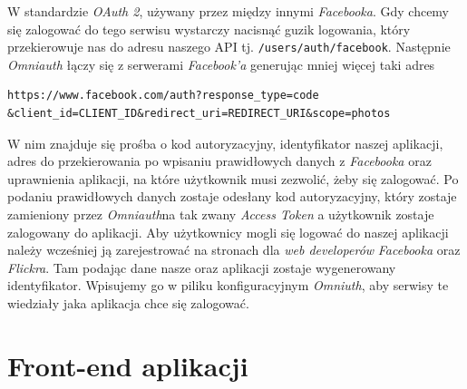 \documentclass[openright]{xmgr}
\begin{document}
\newpage\indent W standardzie \textit{OAuth 2}, używany przez między innymi \textit{Facebooka}. Gdy chcemy się zalogować do tego serwisu wystarczy nacisnąć guzik logowania, który przekierowuje nas do adresu naszego API tj. \verb|/users/auth/facebook|. Następnie \textit{Omniauth} łączy się z serwerami \textit{Facebook'a} generując mniej więcej taki adres 
\begin{verbatim}
https://www.facebook.com/auth?response_type=code
&client_id=CLIENT_ID&redirect_uri=REDIRECT_URI&scope=photos
\end{verbatim}
 W nim znajduje się prośba o kod autoryzacyjny, identyfikator naszej aplikacji, adres do przekierowania po wpisaniu prawidłowych danych z \textit{Facebooka} oraz uprawnienia aplikacji, na które użytkownik musi zezwolić, żeby się zalogować. Po podaniu prawidłowych danych zostaje odesłany kod autoryzacyjny, który zostaje zamieniony przez \textit{Omniauth}na tak zwany \textit{Access Token} a użytkownik zostaje zalogowany do aplikacji. Aby użytkownicy mogli się logować do naszej aplikacji należy wcześniej ją zarejestrować na stronach dla \textit{web developerów} \textit{Facebooka} oraz \textit{Flickra}. Tam podając dane nasze oraz aplikacji zostaje wygenerowany identyfikator. Wpisujemy go w piliku konfiguracyjnym \textit{Omniuth}, aby serwisy te wiedziały jaka aplikacja chce się zalogować.

\section{Front-end aplikacji}
\end{document}
